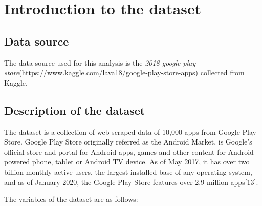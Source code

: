 \documentclass[
]{article}
\subtitle{Final Report}
\author{Sumadhuri Damerla,Shaoor Jan,Ashjan Khan}
\date{}
\begin{document}
{
\setcounter{tocdepth}{2}
\tableofcontents
}
\hypertarget{introduction-to-the-dataset}{%
\section{Introduction to the
dataset}\label{introduction-to-the-dataset}}

\hypertarget{data-source}{%
\subsection{Data source}\label{data-source}}

The data source used for this analysis is the \emph{2018 google play
store}(\url{https://www.kaggle.com/lava18/google-play-store-apps})
collected from Kaggle.

\hypertarget{description-of-the-dataset}{%
\subsection{Description of the
dataset}\label{description-of-the-dataset}}

The dataset is a collection of web-scraped data of 10,000 apps from
Google Play Store. Google Play Store originally referred as the Android
Market, is Google's official store and portal for Android apps, games
and other content for Android-powered phone, tablet or Android TV
device. As of May 2017, it has over two billion monthly active users,
the largest installed base of any operating system, and as of January
2020, the Google Play Store features over 2.9 million apps{[}13{]}.

The variables of the dataset are as follows:
\end{document}
